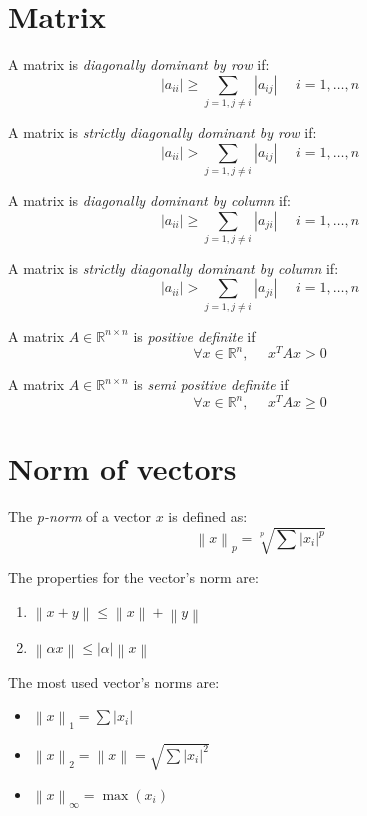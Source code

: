 \documentclass[12pt, a4paper]{report}
\begin{document}
    \section{Matrix}
    \begin{definition}
        A matrix is \emph{diagonally dominant by row} if: 
        \[\left\lvert a_{ii} \right\rvert \geq \sum_{j=1,j \neq i}{\left\lvert a_{ij} \right\rvert} \:\:\:\:\:\: i=1,\dots,n\]

        A matrix is \emph{strictly diagonally dominant by row} if: 
        \[\left\lvert a_{ii} \right\rvert > \sum_{j=1,j \neq i}{\left\lvert a_{ij} \right\rvert} \:\:\:\:\:\: i=1,\dots,n\]

        A matrix is \emph{diagonally dominant by column} if: 
        \[\left\lvert a_{ii} \right\rvert \geq \sum_{j=1,j \neq i}{\left\lvert a_{ji} \right\rvert} \:\:\:\:\:\: i=1,\dots,n \]

        A matrix is \emph{strictly diagonally dominant by column} if: 
        \[\left\lvert a_{ii} \right\rvert > \sum_{j=1,j \neq i}{\left\lvert a_{ji} \right\rvert} \:\:\:\:\:\: i=1,\dots,n \]

        A matrix $A \in \mathbb{R}^{n \times n}$ is \emph{positive definite} if 
        \[\forall x \in \mathbb{R}^{n}, \:\:\:\:\:\: x^T  Ax>0\]

        A matrix $A \in \mathbb{R}^{n \times n}$ is \emph{semi positive definite} if 
        \[\forall x \in \mathbb{R}^{n}, \:\:\:\:\:\: x^T  Ax \geq 0\]
    \end{definition}

    \section{Norm of vectors}
    \begin{definition}
        The \emph{p-norm} of a vector $x$ is defined as: 
        \[\left\lVert x \right\rVert_p=\sqrt[p]{\sum{\left\lvert x_i \right\rvert^p }}\]
    \end{definition}
    The properties for the vector's norm are: 
    \begin{enumerate}
        \item $\left\lVert x+y \right\rVert \leq \left\lVert x \right\rVert + \left\lVert y \right\rVert$
        \item $\left\lVert \alpha x \right\rVert \leq \left\lvert \alpha \right\rvert \left\lVert x \right\rVert$
    \end{enumerate}
    The most used vector's norms are: 
    \begin{itemize}
        \item $\left\lVert x \right\rVert_1=\sum{\left\lvert x_i \right\rvert}$
        \item $\left\lVert x \right\rVert_2=\left\lVert x \right\rVert=\sqrt{\sum{\left\lvert x_i \right\rvert^2}}$
        \item $\left\lVert x \right\rVert_{\infty}=\max{\left(x_i\right)}$
    \end{itemize}
\end{document}
